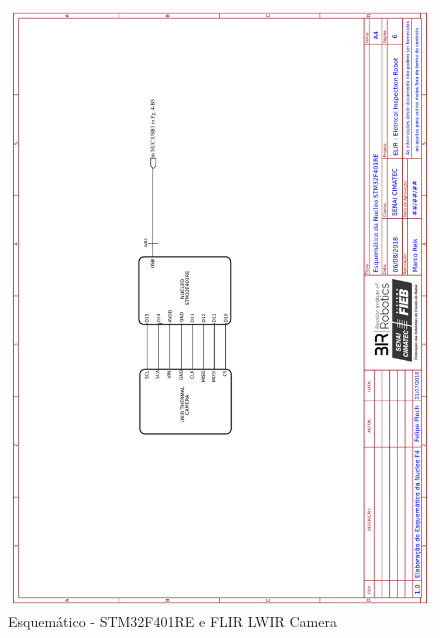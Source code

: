     
    \begin{figure}[h]
	\centering
	\includegraphics[width=14cm]{Figures/EsquematicoFLIR.png}
	\caption{Esquemático - STM32F401RE e FLIR LWIR Camera} \label{FLIR}
	\end{figure}
	
	\pagebreak
	
